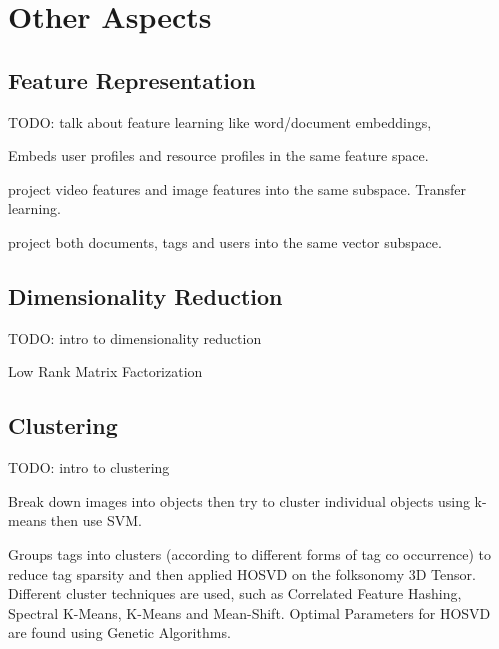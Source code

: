 \section{Other Aspects}\label{section:other_aspects}

\subsection{Feature Representation}

{\color{red} TODO: talk about feature learning like word/document embeddings, }

\cite{tatu_etal_2008} Embeds user profiles and resource profiles in the same feature space.

\cite{han_etal_2010} project video features and image features into the same subspace. Transfer learning.

\cite{kataria_agarwal_2015} project both documents, tags and users into the same vector subspace.

\subsection{Dimensionality Reduction}

{\color{red} TODO: intro to dimensionality reduction }

\cite{song_etal_2008} Low Rank Matrix Factorization









\subsection{Clustering}

{\color{red} TODO: intro to clustering }

\cite{nikolopoulos_etal_2009} Break down images into objects then try to cluster individual objects using k-means then use SVM.

\cite{leginus_etal_2012} Groups tags into clusters (according to different forms of tag co occurrence) to reduce tag sparsity and then applied HOSVD on the folksonomy 3D Tensor.
Different cluster techniques are used, such as Correlated Feature Hashing, Spectral K-Means, K-Means and Mean-Shift. Optimal Parameters for HOSVD are found using Genetic Algorithms.



